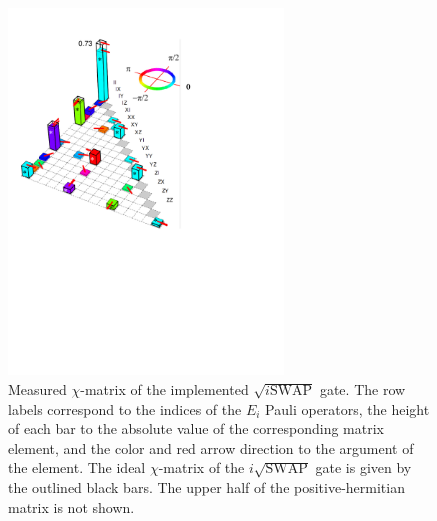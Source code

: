 \begin{figure} \includegraphics[width=0.65\textwidth]{./material/papers/iswap/figures/chi_matrix}
\caption[Measured $\chi$-matrix of the $\sqrt{i\textrm{SWAP}}$ gate]{Measured $\chi$-matrix of the implemented $\sqrt{i\mathrm{SWAP}}$ gate. The row labels correspond to the indices of the $E_{i}$ Pauli operators, the height of each bar to the absolute value of the corresponding matrix element, and the color and red arrow direction to the argument of the element. The ideal $\chi$-matrix of the $i\sqrt{\mathrm{SWAP}}$ gate is given by the outlined black bars. The upper half of the positive-hermitian matrix is not shown.}


\label{fig:gate_chi_matrix_and_errors} \end{figure}


